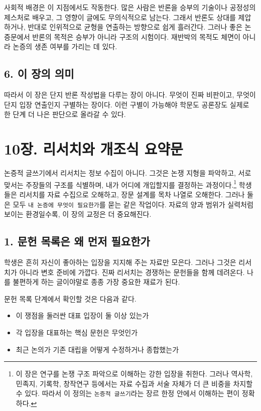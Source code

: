 사회적 배경은 이 지점에서도 작동한다. 많은 사람은 반론을 승부의 기술이나 공정성의 제스처로 배우고, 그 영향이 글에도 무의식적으로 남는다. 그래서 반론도 상대를 제압하거나, 반대로 인위적으로 균형을 연출하는 방향으로 쉽게 흘러간다. 그러나 좋은 논증문에서 반론의 목적은 승부가 아니라 구조의 시험이다. 재반박의 목적도 체면이 아니라 논증의 생존 여부를 가리는 데 있다.

\section{6. 이 장의 의미}\label{6-uxc774-uxc7a5uxc758-uxc758uxbbf8}

따라서 이 장은 단지 반론 작성법을 다루는 장이 아니다. 무엇이 진짜 비판이고, 무엇이 단지 입장 연출인지 구별하는 장이다. 이런 구별이 가능해야 학문도 공론장도 실제로 한 단계 더 나은 판단으로 올라갈 수 있다.

\chapter{10장. 리서치와 개조식 요약문}\label{10uxc7a5-uxb9acuxc11cuxce58uxc640-uxac1cuxc870uxc2dd-uxc694uxc57duxbb38}

논증적 글쓰기에서 리서치는 정보 수집이 아니다. 그것은 논쟁 지형을 파악하고, 서로 맞서는 주장들의 구조를 식별하며, 내가 어디에 개입할지를 결정하는 과정이다.\footnote{이 장은 연구를 논쟁 구조 파악으로 이해하는 강한 입장을 취한다. 그러나 역사학, 민족지, 기록학, 창작연구 등에서는 자료 수집과 서술 자체가 더 큰 비중을 차지할 수 있다. 따라서 이 정의는 \texttt{논증적\ 글쓰기}라는 장르 한정 안에서 이해하는 편이 정확하다.} 학생들은 리서치를 자료 수집으로 오해하고, 장문 설계를 목차 나열로 오해한다. 그러나 둘은 모두 \texttt{내\ 논증에\ 무엇이\ 필요한가}를 묻는 같은 작업이다. 자료의 양과 범위가 실력처럼 보이는 환경일수록, 이 장의 교정은 더 중요해진다.

\section{1. 문헌 목록은 왜 먼저 필요한가}\label{1-uxbb38uxd5cc-uxbaa9uxb85duxc740-uxc65c-uxba3cuxc800-uxd544uxc694uxd55cuxac00}

학생은 흔히 자신이 좋아하는 입장을 지지해 주는 자료만 모은다. 그러나 그것은 리서치가 아니라 변호 준비에 가깝다. 진짜 리서치는 경쟁하는 문헌들을 함께 데려온다. 나를 불편하게 하는 글이야말로 종종 가장 중요한 재료가 된다.

문헌 목록 단계에서 확인할 것은 다음과 같다.

\begin{itemize}
\tightlist
\item
  이 쟁점을 둘러싼 대표 입장이 둘 이상 있는가
\item
  각 입장을 대표하는 핵심 문헌은 무엇인가
\item
  최근 논의가 기존 대립을 어떻게 수정하거나 종합했는가
\end{itemize}

